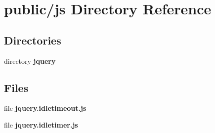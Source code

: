 \section{public/js Directory Reference}
\label{dir_6147c40f4576abc0f79926fdb5243cd4}
\subsection*{Directories}
\begin{DoxyCompactItemize}
\item 
directory {\bf jquery}
\end{DoxyCompactItemize}
\subsection*{Files}
\begin{DoxyCompactItemize}
\item 
file {\bf jquery.\+idletimeout.\+js}
\item 
file {\bf jquery.\+idletimer.\+js}
\end{DoxyCompactItemize}
